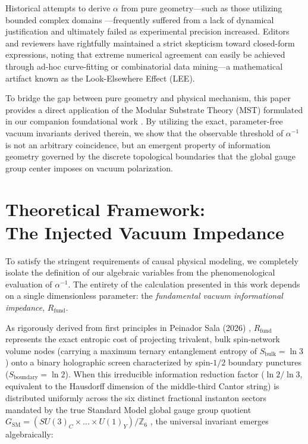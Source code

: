 \documentclass[12pt,a4paper]{article}
\begin{document}
Historical attempts to derive $\alpha$ from pure geometry—such as those utilizing bounded complex domains \cite{wyler1971}—frequently suffered from a lack of dynamical justification and ultimately failed as experimental precision increased. Editors and reviewers have rightfully maintained a strict skepticism toward closed-form expressions, noting that extreme numerical agreement can easily be achieved through ad-hoc curve-fitting or combinatorial data mining—a mathematical artifact known as the Look-Elsewhere Effect (LEE).

To bridge the gap between pure geometry and physical mechanism, this paper provides a direct application of the Modular Substrate Theory (MST) formulated in our companion foundational work \cite{peinador2026_foundational}. By utilizing the exact, parameter-free vacuum invariants derived therein, we show that the observable threshold of $\alpha^{-1}$ is not an arbitrary coincidence, but an emergent property of information geometry governed by the discrete topological boundaries that the global gauge group center imposes on vacuum polarization.


\section{Theoretical Framework:\\ The Injected Vacuum Impedance}

To satisfy the stringent requirements of causal physical modeling, we completely isolate the definition of our algebraic variables from the phenomenological evaluation of $\alpha^{-1}$. The entirety of the calculation presented in this work depends on a single dimensionless parameter: the \textit{fundamental vacuum informational impedance}, $R_{\text{fund}}$.

As rigorously derived from first principles in Peinador Sala (2026) \cite{peinador2026_foundational}, $R_{\text{fund}}$ represents the exact entropic cost of projecting trivalent, bulk spin-network volume nodes (carrying a maximum ternary entanglement entropy of $S_{\text{bulk}} = \ln 3$) onto a binary holographic screen characterized by spin-$1/2$ boundary punctures ($S_{\text{boundary}} = \ln 2$). When this irreducible information reduction factor ($\ln 2 / \ln 3$, equivalent to the Hausdorff dimension of the middle-third Cantor string) is distributed uniformly across the six distinct fractional instanton sectors mandated by the true Standard Model global gauge group quotient $G_{\text{SM}} = (SU(3)_C \times ... \times U(1)_Y) / \mathbb{Z}_6$ \cite{aharony2013}, the universal invariant emerges algebraically:
\end{document}
